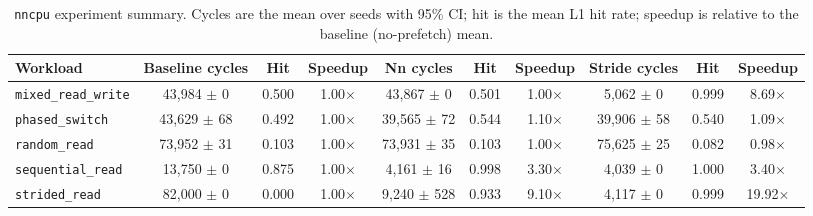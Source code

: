 \begin{table}[t]
  \centering
  \caption{\texttt{nncpu} experiment summary.  Cycles are the
  mean over seeds with 95\% CI; hit is the mean L1 hit rate;
  speedup is relative to the baseline (no-prefetch) mean.
  \label{tab:results}}
  \begin{tabular}{lccccccccc}
    \textbf{Workload} & \textbf{Baseline cycles} & \textbf{Hit} & \textbf{Speedup} & \textbf{Nn cycles} & \textbf{Hit} & \textbf{Speedup} & \textbf{Stride cycles} & \textbf{Hit} & \textbf{Speedup} \\
    \midrule
    \texttt{mixed_read_write} & 43,984 $\pm$ 0 & 0.500 & 1.00$\times$ & 43,867 $\pm$ 0 & 0.501 & 1.00$\times$ & 5,062 $\pm$ 0 & 0.999 & 8.69$\times$ \\
    \texttt{phased_switch} & 43,629 $\pm$ 68 & 0.492 & 1.00$\times$ & 39,565 $\pm$ 72 & 0.544 & 1.10$\times$ & 39,906 $\pm$ 58 & 0.540 & 1.09$\times$ \\
    \texttt{random_read} & 73,952 $\pm$ 31 & 0.103 & 1.00$\times$ & 73,931 $\pm$ 35 & 0.103 & 1.00$\times$ & 75,625 $\pm$ 25 & 0.082 & 0.98$\times$ \\
    \texttt{sequential_read} & 13,750 $\pm$ 0 & 0.875 & 1.00$\times$ & 4,161 $\pm$ 16 & 0.998 & 3.30$\times$ & 4,039 $\pm$ 0 & 1.000 & 3.40$\times$ \\
    \texttt{strided_read} & 82,000 $\pm$ 0 & 0.000 & 1.00$\times$ & 9,240 $\pm$ 528 & 0.933 & 9.10$\times$ & 4,117 $\pm$ 0 & 0.999 & 19.92$\times$ \\
    \bottomrule
  \end{tabular}
\end{table}
